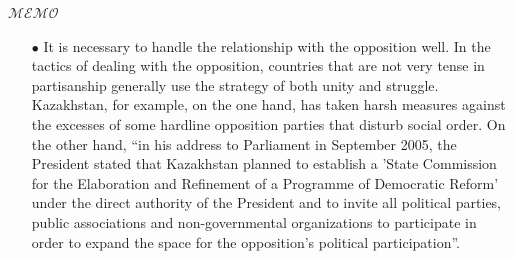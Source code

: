 \documentclass[12pt]{article}  %
\begin{document}
\begin{letter}{\huge{$\mathscr{MEMO}$}}
{\begin{enumerate}[0]
    \item[$\bullet$]  It is necessary to handle the relationship with the opposition well. In the tactics of dealing with the opposition, countries that are not very tense in partisanship generally use the strategy of both unity and struggle. Kazakhstan, for example, on the one hand, has taken harsh measures against the excesses of some hardline opposition parties that disturb social order. On the other hand, ``in his address to Parliament in September 2005, the President stated that Kazakhstan planned to establish a 'State Commission for the Elaboration and Refinement of a Programme of Democratic Reform' under the direct authority of the President and to invite all political parties, public associations and non-governmental organizations to participate in order to expand the space for the opposition's political participation''.


\end{enumerate}}
\end{letter}
\end{document}
